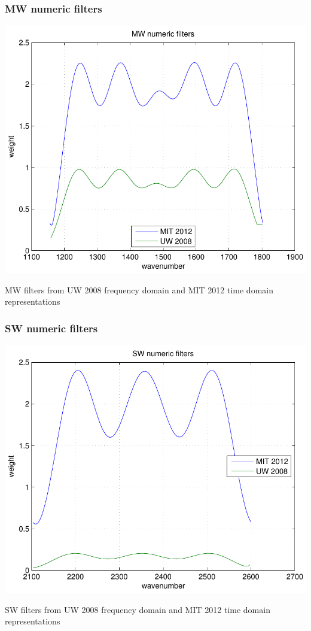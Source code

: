 \documentclass[11pt]{beamer}
\begin{document}
\begin{frame}
\frametitle{MW numeric filters}

\begin{center}
  \includegraphics[scale=0.6]{figures/filters_MW.pdf}
\end{center}

MW filters from UW 2008 frequency domain and MIT 2012 time domain
representations

\end{frame}
\begin{frame}
\frametitle{SW numeric filters}

\begin{center}
  \includegraphics[scale=0.6]{figures/filters_SW.pdf}
\end{center}

SW filters from UW 2008 frequency domain and MIT 2012 time domain
representations

\end{frame}
\end{document}
